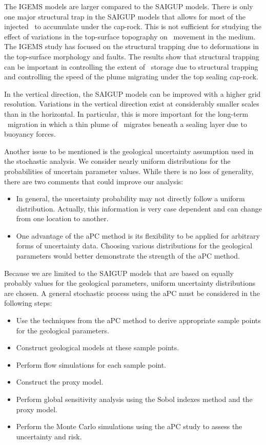 The IGEMS models are larger compared to the SAIGUP models. There is only one major structural trap in the SAIGUP models that allows for most of the injected \coo\ to accumulate under the cap-rock. This is not sufficient for studying the effect of variations in the top-surface topography on \coo\ movement in the medium. The IGEMS study has focused on the structural trapping due to deformations in the top-surface morphology and faults. The results show that structural trapping can be important in controlling the extent of \coo\ storage due to structural trapping and controlling the speed of the plume migrating under the top sealing cap-rock.  

In the vertical direction, the SAIGUP models can be improved with a higher grid resolution. Variations in the vertical direction exist at considerably smaller scales than in the horizontal. In particular, this is more important for the long-term \coo\ migration in which a thin plume of \coo\ migrates beneath a sealing layer due to buoyancy forces.

Another issue to be mentioned is the geological uncertainty assumption used in the stochastic analysis. We consider nearly uniform distributions for the probabilities of uncertain parameter values. While there is no loss of generality, there are two comments that could improve our analysis:

\begin{itemize}
\item In general, the uncertainty probability may not directly follow a uniform distribution. Actually, this information is very case dependent and can change from one location to another.
\item One advantage of the aPC method is its flexibility to be applied for arbitrary forms of uncertainty data. Choosing various distributions for the geological parameters would better demonstrate the strength of the aPC method. 
\end{itemize}

Because we are limited to the SAIGUP models that are based on equally probably values for the geological parameters, uniform uncertainty distributions are chosen. A general stochastic process using the aPC must be considered in the following steps:

\begin{itemize}
\item Use the techniques from the aPC method to derive appropriate sample points for the geological parameters.
\item Construct geological models at these sample points.
\item Perform flow simulations for each sample point.
\item Construct the proxy model.
\item Perform global sensitivity analysis using the Sobol indexes method and the proxy model. 
\item Perform the Monte Carlo simulations using the aPC study to assess the uncertainty and risk.
\end{itemize}


